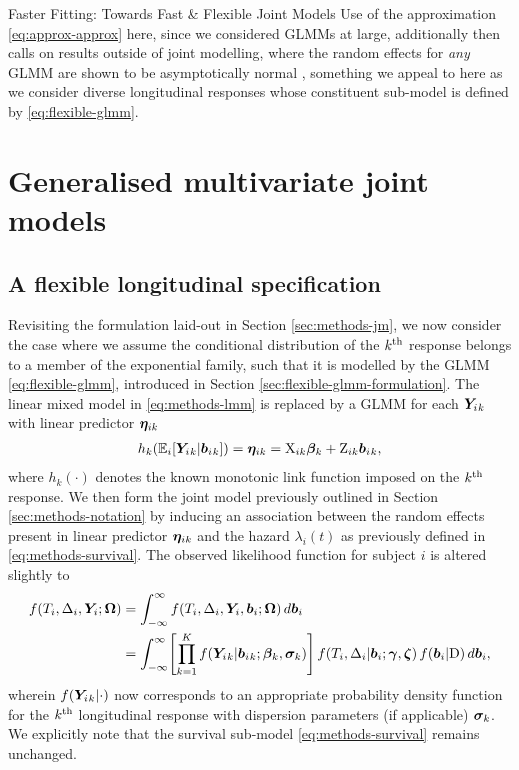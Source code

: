 \begin{chapter}{\label{cha:flexible}Faster Fitting: Towards Fast \& Flexible Joint Models}
Use of the approximation \eqref{eq:approx-approx} here, since we considered GLMMs at large, additionally then calls on results outside of joint modelling, where the random effects for \textit{any} GLMM are shown to be asymptotically normal \citep{baghishani2012}, something we appeal to here as we consider diverse longitudinal responses whose constituent sub-model is defined by \eqref{eq:flexible-glmm}.

\section{Generalised multivariate joint models}\label{sec:flexible-gmvjm}
\subsection{A flexible longitudinal specification}\label{sec:flexible-gmvjm-formulation}
Revisiting the formulation laid-out in Section \ref{sec:methods-jm}, we now consider the case where we assume the conditional distribution of the $k^{\text{th}}$ response belongs to a member of the exponential family, such that it is modelled by the GLMM \eqref{eq:flexible-glmm}, introduced in Section \ref{sec:flexible-glmm-formulation}. The linear mixed model in \eqref{eq:methods-lmm} is replaced by a GLMM for each $\bm{Y}_i{_k}$ with linear predictor $\bm{\eta}_{ik}$
\begin{align}
    h_k\!\left( \mathbb{E}_i\!\left[\bm{Y}_i{_k}|\bm{b}_i{_k}\right]\right)=\bm{\eta}_{ik}=\mathrm{X}_{ik}\bm{\beta}_k+\mathrm{Z}_{ik}\bm{b}_i{_k},
\label{eq:flexible-jm-glmm}
\end{align}
where $h_k(\cdot)$ denotes the known monotonic link function imposed on the $k^{\text{th}}$ response. We then form the joint model previously outlined in Section \ref{sec:methods-notation} by inducing an association between the random effects present in linear predictor $\bm{\eta}_{ik}$ and the hazard $\lambda_i(t)$ as previously defined in \eqref{eq:methods-survival}. The observed likelihood function for subject $i$ is altered slightly to
\begin{align}
    f\!\left( T_i, \Delta_i, \bm{Y}_i; \bm{\mathrm{\Omega}}\right) &= \int_{-\infty}^\infty f\!\left( T_i, \Delta_i, \bm{Y}_i, \bm{b}_i; \bm{\mathrm{\Omega}}\right) d\bm{b}_i \nonumber \\
    &= \int_{-\infty}^\infty\!\left[\prod_{k=1}^K f\!\left(\bm{Y}_i{_k}|\bm{b}_i{_k};\bm{\beta}_k,\bm{\sigma}_k\right)\right] f\!\left( T_i,\Delta_i|\bm{b}_i;\bm{\gamma},\bm{\zeta}\right) f\!\left(\bm{b}_i|\mathrm{D}\right) d\bm{b}_i,
    \label{eq:flexible-likelihood-glmm}
\end{align}
wherein $f\!\left(\bm{Y}_i{_k}|\cdot\right)$ now corresponds to an appropriate probability density function for the $k^{\text{th}}$ longitudinal response with dispersion parameters (if applicable) $\bm{\sigma}_k$. We explicitly note that the survival sub-model \eqref{eq:methods-survival} remains unchanged. 


\end{chapter}
